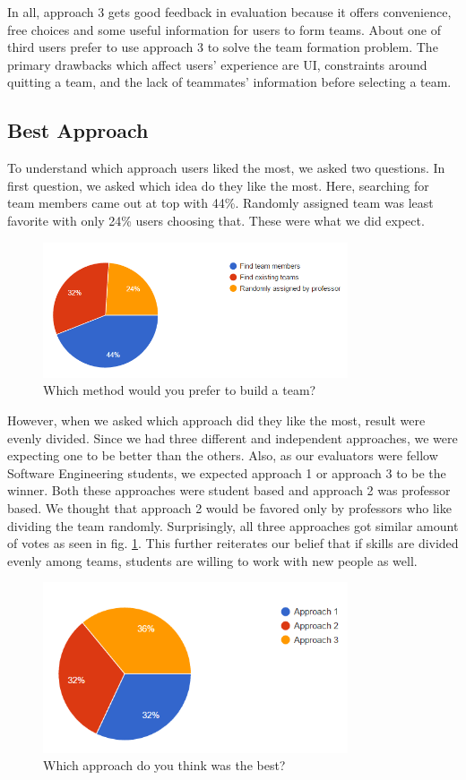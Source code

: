 \documentclass[conference]{IEEEtran}
\begin{document}
In all, approach 3 gets good feedback in evaluation because it offers convenience, free choices and some useful information for users to form teams. About one of third users prefer to use approach 3 to solve the team formation problem. The primary drawbacks which affect users' experience are UI, constraints around quitting a team, and the lack of teammates' information before selecting a team. 


\subsection{Best Approach}
To understand which approach users liked the most, we asked two questions. In first question, we asked which idea do they like the most. Here, searching for team members came out at top with 44\%. Randomly assigned team was least favorite with only 24\% users choosing that. These were what we did expect.
\begin{figure}[H]
    \centering
    \includegraphics[width=9cm]{image/ChoosingMethod.PNG}
    \caption{Which method would you prefer to build a team?}
\end{figure}

However, when we asked which approach did they like the most, result were evenly divided. Since we had three different and independent approaches, we were expecting one to be better than the others. Also, as our evaluators were fellow Software Engineering students, we expected approach 1 or approach 3 to be the winner. Both these approaches were student based and approach 2 was professor based. We thought that approach 2 would be favored only by professors who like dividing the team randomly. Surprisingly, all three approaches got similar amount of votes as seen in fig. \ref{bestapp.gf}. This further reiterates our belief that if skills are divided evenly among teams, students are willing to work with new people as well. 
\begin{figure}[H]
    \centering
    \includegraphics[width=9cm]{image/ChoosingApproach.PNG}
    \caption{Which approach do you think was the best?}
    \label{bestapp.gf}
\end{figure}
\end{document}
